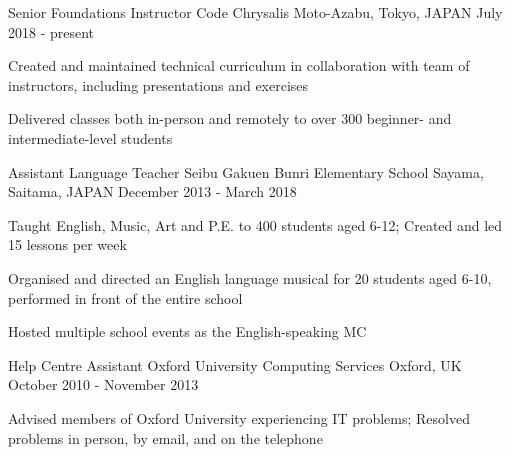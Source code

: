 \begin{cventries}
  \cventry
  {Senior Foundations Instructor} %
  {Code Chrysalis} %
  {Moto-Azabu, Tokyo, JAPAN} %
  {July 2018 - present} %
  {
    \begin{cvitems} %
      \item {Created and maintained technical curriculum in collaboration with team of instructors, including presentations and exercises}
      \item {Delivered classes both in-person and remotely to over 300 beginner- and intermediate-level students}
    \end{cvitems}
  }

  \cventry
  {Assistant Language Teacher} %
  {Seibu Gakuen Bunri Elementary School} %
  {Sayama, Saitama, JAPAN} %
  {December 2013 - March 2018} %
  {
    \begin{cvitems} %
      \item {Taught English, Music, Art and P.E. to 400 students aged 6-12; Created and led 15 lessons per week}
      \item {Organised and directed an English language musical for 20 students aged 6-10, performed in front of the entire school}
      \item {Hosted multiple school events as the English-speaking MC}
    \end{cvitems}
  }

  \cventry
  {Help Centre Assistant} %
  {Oxford University Computing Services} %
  {Oxford, UK} %
  {October 2010 - November 2013} %
  {
    \begin{cvitems} %
      \item {Advised members of Oxford University experiencing IT problems; Resolved problems in person, by email, and on the telephone}
    \end{cvitems}
  }

\end{cventries}
